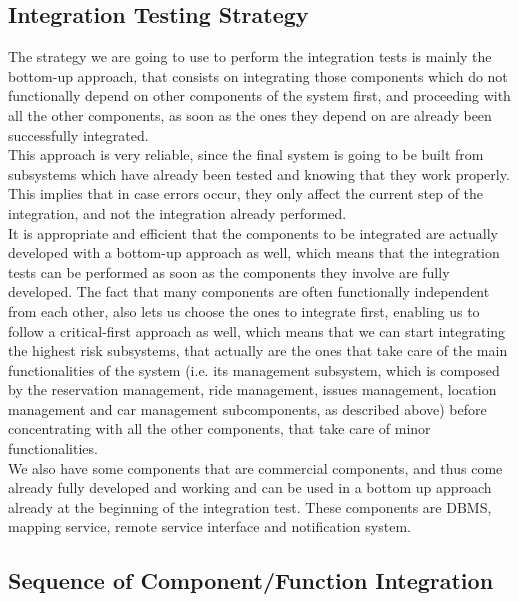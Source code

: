 \documentclass{article}
\begin{document}
\begin{flushleft}
   
   
\newpage   
   \subsection{Integration Testing Strategy}		%
   The strategy we are going to use to perform the integration tests is mainly the bottom-up approach, that consists on integrating  those components which do not functionally depend on other components of the system first, and proceeding with all the other components, as soon as the ones they depend on are already been successfully integrated. \\ 
   This approach is very reliable, since the final system is going to be built from subsystems which have already been tested and knowing that they work properly. This implies that in case errors occur, they only affect the current step of the integration, and not the integration already performed.\\
    It is appropriate and efficient that the components to be integrated are actually developed with a bottom-up approach as well, which means that the integration tests can be performed as soon as the components they involve are fully developed. The fact that many components are often functionally independent from each other, also lets us choose the ones to integrate first, enabling us to follow a critical-first approach as well, which means that we can start integrating the highest risk subsystems, that actually are the ones that take care of the main functionalities of the system (i.e. its management subsystem, which is composed by the reservation management, ride management, issues management, location management and car management subcomponents, as described above) before concentrating with all the other components, that take care of minor functionalities. \\
    We also have some components that are commercial components, and thus come already fully developed and working and can be used in a bottom up approach already at the beginning of the integration test. These components are DBMS, mapping service, remote service interface and notification system.
   
   \newpage
   
   
   
   
   \subsection{Sequence of Component/Function Integration}		%
   

\end{flushleft}
\end{document}
